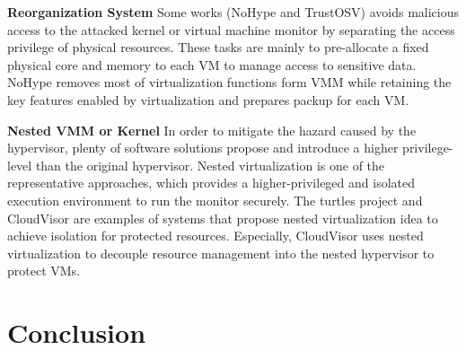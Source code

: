 \documentclass[conference]{IEEEtran}
\begin{document}
\textbf{Reorganization System}
Some works  (NoHype\cite{NoHype} and TrustOSV\cite{TrustOSV}) avoids malicious access to the attacked kernel or virtual machine monitor by separating the access privilege of physical resources. These tasks are mainly to pre-allocate a fixed physical core and memory to each VM to manage access to sensitive data. NoHype removes most of virtualization functions form VMM  while retaining the key features enabled by virtualization and prepares packup for each VM.

\textbf{Nested VMM or Kernel}
In order to mitigate the hazard caused by the hypervisor, plenty of software solutions propose and introduce a higher privilege-level than the original hypervisor. Nested virtualization is one of the representative approaches, which provides a higher-privileged and isolated execution environment to run the monitor securely. The turtles project \cite{Ben2007The} and CloudVisor \cite{Zhang2011CloudVisor} are examples of systems that propose nested virtualization idea to achieve isolation for protected resources. Especially, CloudVisor uses nested virtualization to decouple resource management into the nested hypervisor to protect VMs.



\section{Conclusion}\label{sec:conclusion}



%
% 
%
\end{document}
